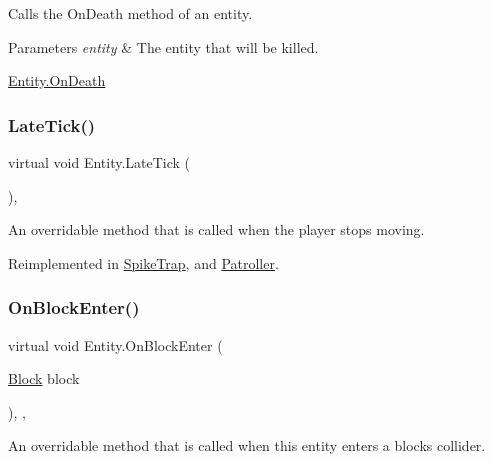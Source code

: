 Calls the On\+Death method of an entity. 


\begin{DoxyParams}{Parameters}
{\em entity} & The entity that will be killed. \\
\hline
\end{DoxyParams}
\mbox{\hyperlink{class_entity_a6039178e15537a356d8fde707c9e0b69}{Entity.\+On\+Death}} \mbox{\label{class_entity_a80e2936e1d8d8590dc183b2980fcd3c9}} 
\subsubsection{\texorpdfstring{Late\+Tick()}{LateTick()}}
{\footnotesize\ttfamily virtual void Entity.\+Late\+Tick (\begin{DoxyParamCaption}{ }\end{DoxyParamCaption})\hspace{0.3cm}{\ttfamily [inline]}, {\ttfamily [virtual]}}



An overridable method that is called when the player stops moving. 



Reimplemented in \mbox{\hyperlink{class_spike_trap_acedae588051f3999c6c364ae031c9814}{Spike\+Trap}}, and \mbox{\hyperlink{class_patroller_a72fbde4c18c8b857a43e63ed5b830f53}{Patroller}}.

\mbox{\label{class_entity_a8c0a0d1bbee6bf816ff122f2ddfd8820}} 
\subsubsection{\texorpdfstring{On\+Block\+Enter()}{OnBlockEnter()}}
{\footnotesize\ttfamily virtual void Entity.\+On\+Block\+Enter (\begin{DoxyParamCaption}\item[{\mbox{\hyperlink{class_block}{Block}}}]{block }\end{DoxyParamCaption})\hspace{0.3cm}{\ttfamily [inline]}, {\ttfamily [protected]}, {\ttfamily [virtual]}}



An overridable method that is called when this entity enters a block\textquotesingle{}s collider. 

